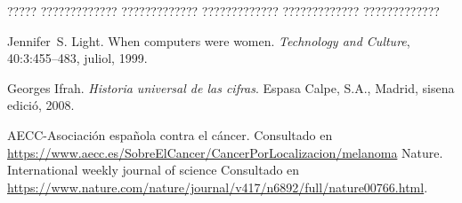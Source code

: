 \documentclass[11pt,spanish,listoffigures,listoftables]{tfgetsinf}
\begin{document}
????? ????????????? ????????????? ????????????? ????????????? ????????????? 


\begin{thebibliography}{10}

   Jennifer~S. Light.
   \newblock When computers were women.
   \newblock \textit{Technology and Culture}, 40:3:455--483, juliol, 1999.

   Georges Ifrah.
   \newblock \textit{Historia universal de las cifras}.
   \newblock Espasa Calpe, S.A., Madrid, sisena edició, 2008.

   AECC-Asociaci\'on espa\~nola contra el c\'ancer. 
   \newblock Consultado en
   \url{https://www.aecc.es/SobreElCancer/CancerPorLocalizacion/melanoma}
   Nature. International weekly journal of science 
   \newblock Consultado en
   \url{https://www.nature.com/nature/journal/v417/n6892/full/nature00766.html}.

\end{thebibliography}
\cleardoublepage


\APPENDIX

\end{document}
